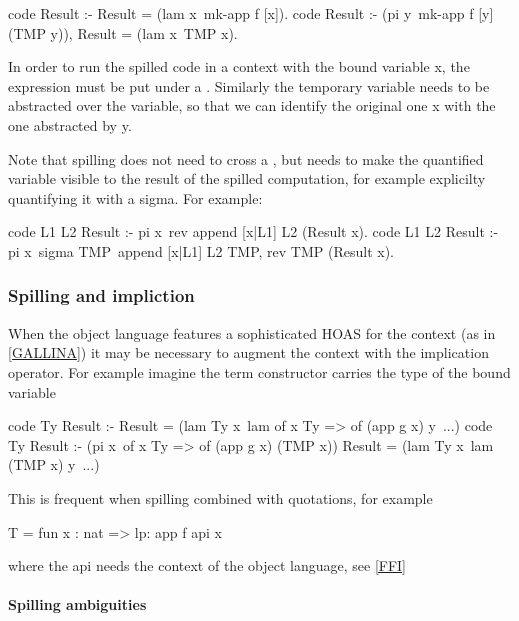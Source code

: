 \documentclass[a4paper, 11pt]{book}
\begin{document}
\begin{elpicode}
code Result :- Result = (lam x\ {mk-app f [x]}).
code Result :- (pi y\ mk-app f [y] (TMP y)), Result = (lam x\ TMP x).
\end{elpicode}
  

In order to run the spilled code in a context with the bound variable
x, the expression must be put under a . Similarly
the temporary variable needs to be abstracted over the variable, so
that we can identify the original one x with the one abstracted by
 y.

Note that spilling does not need to cross a , but
needs to make the quantified variable visible to the result of
the spilled computation, for example explicilty quantifying it
with a sigma. For example:

\begin{elpicode}
  code L1 L2 Result :- pi x\ rev {append [x|L1] L2} (Result x).
  code L1 L2 Result :- pi x\ sigma TMP\ append [x|L1] L2 TMP, rev TMP (Result x).
\end{elpicode}

\subsubsection{Spilling and impliction}

When the object language features a sophisticated HOAS for the context
(as in \ref{GALLINA}) it may be necessary to augment the context with
the implication operator. For example imagine the 
term constructor carries the type of the bound variable

\begin{elpicode}
  code Ty Result :- Result = (lam Ty x\ lam {of x Ty => of (app g x)} y\ ...)
  code Ty Result :-
    (pi x\ of x Ty => of (app g x) (TMP x))
    Result = (lam Ty x\ lam (TMP x) y\ ...)
\end{elpicode}

This is frequent when spilling combined with quotations, for example

\begin{elpicode}
  T = {{ fun x : nat => lp:{{ app f {api x}  }}  }}
\end{elpicode}

where the api needs the context of the object language, see \ref{FFI}

\paragraph{Spilling ambiguities}
\end{document}
